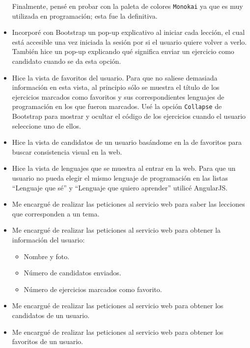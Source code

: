 \begin{itemize}
Finalmente, pensé en probar con la paleta de colores \texttt{Monokai} ya que es muy utilizada en programación; esta fue la definitiva.

\item
Incorporé con Bootstrap un pop-up explicativo al iniciar cada lección, el cual está accesible una vez iniciada la sesión por si el usuario quiere volver a verlo. También hice un pop-up explicando qué significa enviar un ejercicio como candidato cuando se da esta opción.

\item
Hice la vista de favoritos del usuario. Para que no saliese demasiada información en esta vista, al principio sólo se muestra el título de los ejercicios marcados como favoritos y sus correspondientes lenguajes de programación en los que fueron marcados. Usé la opción \texttt{Collapse} de Bootstrap para mostrar y ocultar el código de los ejercicios cuando el usuario seleccione uno de ellos.

\item
Hice la vista de candidatos de un usuario basándome en la de favoritos para buscar consistencia visual en la web.

\item
Hice la vista de lenguajes que se muestra al entrar en la web. Para que un usuario no pueda elegir el mismo lenguaje de programación en las listas ``Lenguaje que sé'' y ``Lenguaje que quiero aprender'' utilicé AngularJS.

\item
Me encargué de realizar las peticiones al servicio web para saber las lecciones que corresponden a un tema.

\item
Me encargué de realizar las peticiones al servicio web para obtener la información del usuario:

\begin{itemize}
\item
Nombre y foto.
\item
Número de candidatos enviados.
\item
Número de ejercicios marcados como favorito.
\end{itemize}

\item
Me encargué de realizar las peticiones al servicio web para obtener los candidatos de un usuario.

\item
Me encargué de realizar las peticiones al servicio web para obtener los favoritos de un usuario.


\end{itemize}
